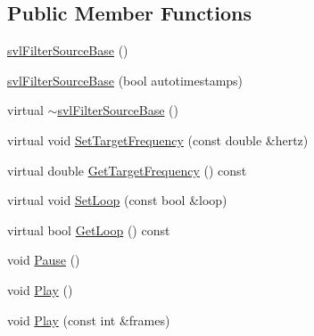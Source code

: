 \subsection*{Public Member Functions}
\begin{DoxyCompactItemize}
\item 
\hyperlink{classsvl_filter_source_base_a35532f5df7d55568fa65bb2fd9c680e6}{svl\-Filter\-Source\-Base} ()
\item 
\hyperlink{classsvl_filter_source_base_a7348ada5c7c667d1a7548a65952f7db7}{svl\-Filter\-Source\-Base} (bool autotimestamps)
\item 
virtual \hyperlink{classsvl_filter_source_base_a321b737538c8881c24804a0b115333c8}{$\sim$svl\-Filter\-Source\-Base} ()
\item 
virtual void \hyperlink{classsvl_filter_source_base_afa3df2b062e408bcc91789986cb8e7be}{Set\-Target\-Frequency} (const double \&hertz)
\item 
virtual double \hyperlink{classsvl_filter_source_base_a5b5d1b96c248afc1d5ecc099b879e0c5}{Get\-Target\-Frequency} () const 
\item 
virtual void \hyperlink{classsvl_filter_source_base_a982e352327cb6be4e2d8eaa6d07a9521}{Set\-Loop} (const bool \&loop)
\item 
virtual bool \hyperlink{classsvl_filter_source_base_a32e21fc646531ce72b2fc02f6a33fb1a}{Get\-Loop} () const 
\item 
void \hyperlink{classsvl_filter_source_base_a821a6fce53b224e63b1e534a5ffcbee1}{Pause} ()
\item 
void \hyperlink{classsvl_filter_source_base_affb82ef0a14ae22a802fe1450ab46314}{Play} ()
\item 
void \hyperlink{classsvl_filter_source_base_a1cbaa1f9e3156b5c7976d460f24178ef}{Play} (const int \&frames)
\end{DoxyCompactItemize}
